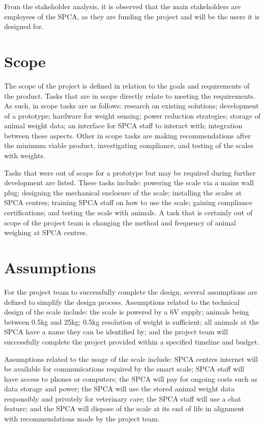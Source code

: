 From the stakeholder analysis, it is observed that the main stakeholders are employees of the SPCA, as they are funding the project and will be the users it is designed for.


\section{Scope}

The scope of the project is defined in relation to the goals and requirements of the product. Tasks that are in scope directly relate to meeting the requirements. As such, in scope tasks are as follows: research on existing solutions; development of a prototype; hardware for weight sensing; power reduction strategies; storage of animal weight data; an interface for SPCA staff to interact with; integration between these aspects. Other in scope tasks are making recommendations after the minimum viable product, investigating compliance, and testing of the scales with weights.

Tasks that were out of scope for a prototype but may be required during further development are listed. These tasks include: powering the scale via a mains wall plug; designing the mechanical enclosure of the scale; installing the scales at SPCA centres; training SPCA staff on how to use the scale; gaining compliance certifications; and testing the scale with animals. A task that is certainly out of scope of the project team is changing the method and frequency of animal weighing at SPCA centres.


\section{Assumptions}

For the project team to successfully complete the design, several assumptions are defined to simplify the design process. Assumptions related to the technical design of the scale include: the scale is powered by a 6V supply; animals being between 0.5kg and 25kg; 0.5kg resolution of weight is sufficient; all animals at the SPCA have a name they can be identified by; and the project team will successfully complete the project provided within a specified timeline and budget.

Assumptions related to the usage of the scale include: SPCA centres internet will be available for communications required by the smart scale; SPCA staff will have access to phones or computers; the SPCA will pay for ongoing costs such as data storage and power; the SPCA will use the stored animal weight data responsibly and privately for veterinary care; the SPCA staff will use a chat feature; and the SPCA will dispose of the scale at its end of life in alignment with recommendations made by the project team.

